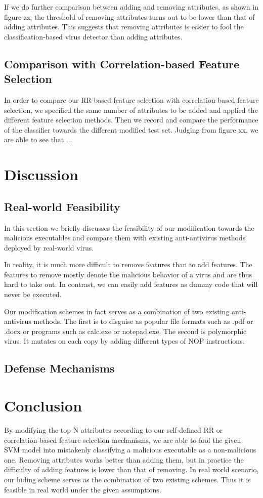 \documentclass[11pt]{article}
\begin{document}
If we do further comparison between adding and removing attributes, as shown in figure zz, the threshold of removing attributes turns out to be lower than that of adding attributes. This suggests that removing attributes is easier to fool the classification-based virus detector than adding attributes.

\subsection{Comparison with Correlation-based Feature Selection}
In order to compare our RR-based feature selection with correlation-based feature selection, we specified the same number of attributes to be added and applied the different feature selection methods. Then we record and compare the performance of the classifier towards the different modified test set. Judging from figure xx, we are able to see that ...

\section{Discussion}

\subsection{Real-world Feasibility}
In this section we briefly discusses the feasibility of our modification towards the malicious executables and compare them with existing anti-antivirus methods deployed by real-world virus.

In reality, it is much more difficult to remove features than to add features. The features to remove mostly denote the malicious behavior of a virus and are thus hard to take out. In contrast, we can easily add features as dummy code that will never be executed.

Our modification schemes in fact serves as a combination of two existing anti-antivirus methods. The first is to disguise as popular file formats such as .pdf or .docx or programs such as calc.exe or notepad.exe. The second is polymorphic virus. It mutates on each copy by adding different types of NOP instructions.

\subsection{Defense Mechanisms}

\section{Conclusion}
By modifying the top N attributes according to our self-defined RR or correlation-based feature selection mechanisms, we are able to fool the given SVM model into mistakenly classifying a malicious executable as a non-malicious one. Removing attributes works better than adding them, but in practice the difficulty of adding features is lower than that of removing. In real world scenario, our hiding scheme serves as the combination of two existing schemes. Thus it is feasible in real world under the given assumptions.
\end{document}
